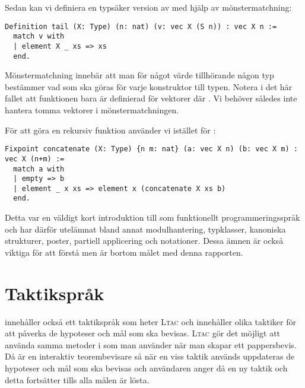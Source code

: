 Sedan kan vi definiera en typsäker version av  med hjälp av
mönstermatchning:
\begin{lstlisting}
Definition tail (X: Type) (n: nat) (v: vec X (S n)) : vec X n :=
  match v with
  | element X _ xs => xs
  end.
\end{lstlisting}
Mönstermatchning innebär att man för något värde tillhörande någon typ
bestämmer vad som ska göras för varje konstruktor till typen. Notera i det här
fallet att funktionen bara är definierad för vektorer  där . Vi behöver således inte hantera tomma vektorer i mönstermatchningen.

För att göra en rekursiv funktion använder vi  istället för
:
\begin{lstlisting}
Fixpoint concatenate (X: Type) {n m: nat} (a: vec X n) (b: vec X m) : vec X (n+m) :=
  match a with
  | empty => b
  | element _ x xs => element x (concatenate X xs b)
  end.
\end{lstlisting}

Detta var en väldigt kort introduktion till \coq som funktionellt
programmeringsspråk och har därför utelämnat bland annat modulhantering,
typklasser, kanoniska strukturer, poster, partiell applicering och notationer.
Dessa ämnen är också viktiga för att förstå \coq men är bortom målet med denna
rapporten.

\section{Taktikspråk}
\coq innehåller också ett taktikspråk som heter \textsc{Ltac} och innehåller
olika taktiker för att påverka de hypoteser och mål som ska bevisas.
\textsc{Ltac} gör det möjligt att använda samma metoder i \coq som man använder
när man skapar ett pappersbevis. Då \coq är en interaktiv teorembevisare så när
en viss taktik används uppdateras de hypoteser och mål som ska bevisas och
användaren anger då en ny taktik och detta fortsätter tills alla målen är
lösta.
